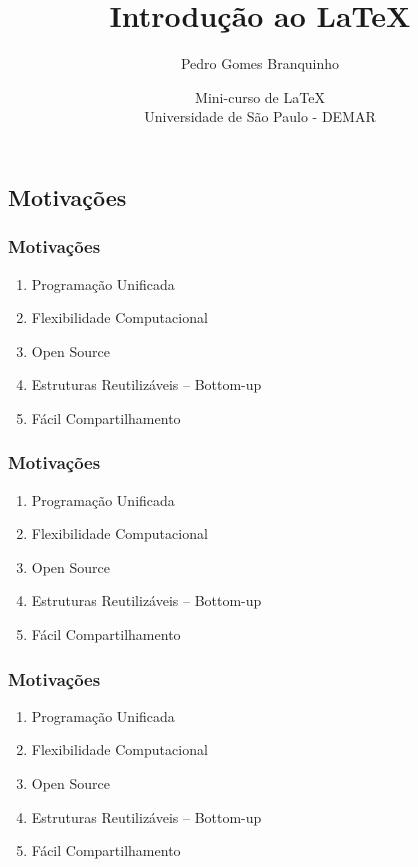 \documentclass[9pt]{beamer}
\title[Introdução ao \LaTeX]{\Huge{Introdução ao \LaTeX}}
\author[Branquinho]{Pedro Gomes Branquinho \\
  \text{\scriptsize{pedro.branquinho@usp.br}}}
\date[EEL-USP]{\scriptsize{Mini-curso de \LaTeX} \\ Universidade de São Paulo - DEMAR}
\begin{document}
{



  \begin{frame}
    \titlepage
  \end{frame}
}


\begin{frame}
  \section{Motivações}
  \frametitle{Motivações}

  \begin{enumerate}
  \item{Programação Unificada}
  \item{Flexibilidade Computacional}
  \item{Open Source}
  \item{Estruturas Reutilizáveis -- Bottom-up}
  \item{Fácil Compartilhamento}
  \end{enumerate}

\end{frame}

\begin{frame}
  \frametitle{Motivações}

  \begin{enumerate}
  \item<1->{Programação Unificada}
  \item<5->{Flexibilidade Computacional}
  \item<2->{Open Source}
  \item<3->{Estruturas Reutilizáveis -- Bottom-up}
  \item<4->{Fácil Compartilhamento}
  \end{enumerate}

\end{frame}

\begin{frame}
  \frametitle{Motivações}

  \begin{enumerate}
  \item<1->[\ding{98}]{Programação Unificada}
  \item<5->[\ding{168}]{Flexibilidade Computacional}
  \item<2->[\ding{170}]{Open Source}
  \item<3->[\ding{171}]{Estruturas Reutilizáveis -- Bottom-up}
  \item<4->[\ding{169}]{Fácil Compartilhamento}
  \end{enumerate}

\end{frame}
\end{document}
